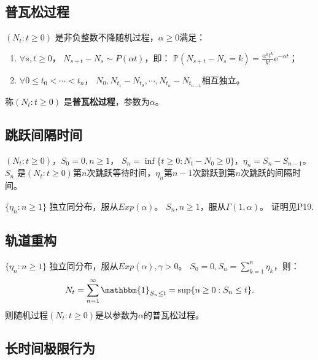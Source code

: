 \documentclass[main]{subfiles}
\begin{document}
\subsection{普瓦松过程}
\begin{definition}\label{def:Poisson Process}
  \((N_t: t \geq 0)\) 是非负整数不降随机过程，\(\alpha \geq 0\)满足： 
  \begin{enumerate}
    \item \(\forall s,t \geq 0\)， \(N_{s + t}-N_s \sim P(\alpha t)\)，即：
      \(\mathbb{P}(N_{s + t}-N_s=k)=\frac{\alpha^kt^k}{k !}\mathrm{e}^{-\alpha t}\)； 
    \item \(\forall 0 \leq t_0 < \cdots< t_n\)， \(N_0,N_{t_{1}}-N_{t_0},\cdots,N_{t_n}-N_{t_{n-1}}\)相互独立。
  \end{enumerate}
  称\((N_t:t \geq 0)\) 是\textbf{普瓦松过程}，参数为\(\alpha\)。
\end{definition}
\subsection{跳跃间隔时间}
\((N_t: t \geq 0)\)，\(S_0=0,n \geq 1\)， \(S_n=\inf \{t \geq 0: N_t-N_0 \geq 0\}\)，\(\eta_n=S_n-S_{n-1}\)。
\(S_n\) 是\((N_t : t \geq 0)\)第\(n\)次跳跃等待时间，\(\eta_n\)第\(n-1\)次跳跃到第\(n\)次跳跃的间隔时间。
\begin{theorem}\label{the:1.4.1}
  \(\{\eta_n:n \geq 1\}\) 独立同分布，服从\(Exp(\alpha)\)。
  \(S_n, n \geq 1\)，服从\(\Gamma(1,\alpha)\)。
  证明见P19.
\end{theorem}
\subsection{轨道重构}
\begin{theorem}\label{the:1.4.3}
  \(\{\eta_n:n \geq 1\}\) 独立同分布，服从\(Exp(\alpha),\gamma >0\)。
  \(S_0=0,S_n=\sum_{k=1}^{n} \eta_k\)，则：
  \[
    N_t=\sum_{n=1}^{\infty} \mathbbm{1}_{S_n \leq t}=\sup\{n \geq 0: S_n \leq t\}.
  \]
  则随机过程\((N_t:t \geq 0)\)是以参数为\(\alpha\)的普瓦松过程。
\end{theorem}
\subsection{长时间极限行为}






\ifSubfilesClassLoaded{%
  \printindex }{%
}
\end{document}
